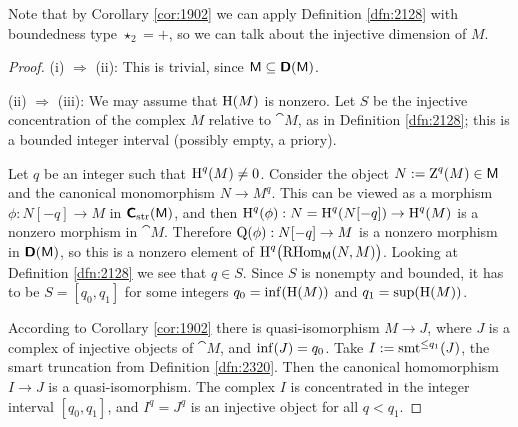 Note that by Corollary \ref{cor:1902} we can apply Definition \ref{dfn:2128} 
with boundedness type $\star_2 = +$, so we can talk about the injective 
dimension of $M$. 

\begin{proof} \mbox{}

\smallskip \noindent
(i) $\Rightarrow$ (ii): This is trivial, since 
$\operatorname{\mathsf{M}} \subseteq \boldsymbol{\mathsf{D}}(\operatorname{\mathsf{M}})$. 

\medskip \noindent 
(ii)  $\Rightarrow$ (iii): We may assume that $\operatorname{H}(M)$ is nonzero. 
Let $S$ be the injective concentration of the complex $M$
relative to $\cat{M}$, as in Definition \ref{dfn:2128}; this is a bounded 
integer interval (possibly empty, a priory). 

Let $q$ be an integer such that $\operatorname{H}^q(M) \neq 0$.
Consider the object $N := \operatorname{Z}^q(M) \in \operatorname{\mathsf{M}}$ and the canonical 
monomorphism $N \to M^q$. This can be viewed as a morphism 
$\phi : N[-q] \to M$ in $\boldsymbol{\mathsf{C}}_{\mathrm{str}}(\operatorname{\mathsf{M}})$, and then 
$\operatorname{H}^q(\phi) : N = \operatorname{H}^q(N[-q]) \to \operatorname{H}^q(M)$ 
is a nonzero morphism in $\cat{M}$. Therefore
$\operatorname{Q}(\phi) :  N[-q] \to M$
is a nonzero morphism in $\boldsymbol{\mathsf{D}}(\operatorname{\mathsf{M}})$, so this is a nonzero element of 
$\operatorname{H}^q \bigl( \operatorname{RHom}_{\operatorname{\mathsf{M}}}(N, M) \bigr)$. 
Looking at Definition \ref{dfn:2128} we see that $q \in S$.
Since $S$ is nonempty and bounded, it has to be 
$S = [q_0, q_1]$ for some integers
$q_0 = \operatorname{inf}(\operatorname{H}(M))$ and $q_1 = \operatorname{sup}(\operatorname{H}(M))$.

According to Corollary \ref{cor:1902} there is 
quasi-isomorphism $M \to J$, where $J$ is a complex of injective objects of 
$\cat{M}$, and $\operatorname{inf}(J) = q_0$. 
Take $I := \operatorname{smt}^{\leq q_1}(J)$, the smart truncation from Definition 
\ref{dfn:2320}. 
Then the canonical homomorphism 
$I \to J$ is a quasi-isomorphism. The complex $I$ is concentrated in the 
integer interval $[q_0, q_1]$, and
$I^q = J^q$ is an injective object for all $q < q_1$. 


\end{proof}
